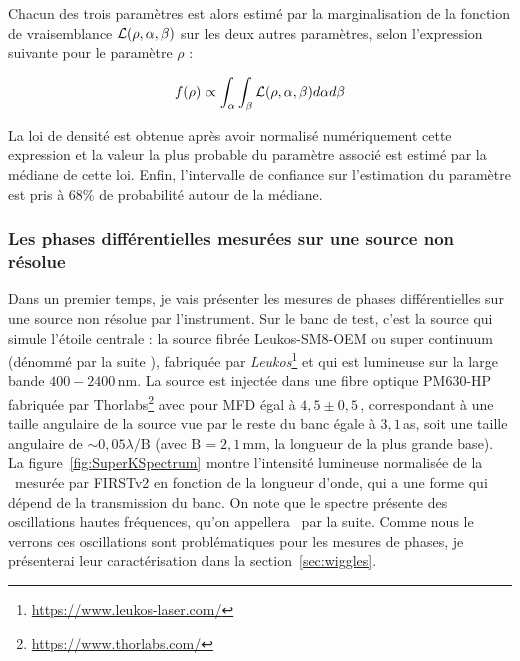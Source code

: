 Chacun des trois paramètres est alors estimé par la marginalisation de la fonction de vraisemblance $\mathcal{L} (\rho, \alpha, \beta)$ sur les deux autres paramètres, selon l'expression suivante pour le paramètre $\rho$ :

\begin{equation}
    f (\rho) \propto \int_{\alpha} \int_{\beta} \mathcal{L} (\rho, \alpha, \beta) d\alpha d\beta
\end{equation}

La loi de densité est obtenue après avoir normalisé numériquement cette expression et la valeur la plus probable du paramètre associé est estimé par la médiane de cette loi. Enfin, l'intervalle de confiance sur l'estimation du paramètre est pris à $68 \%$ de probabilité autour de la médiane.


\subsubsection{Les phases différentielles mesurées sur une source non résolue}

Dans un premier temps, je vais présenter les mesures de phases différentielles sur une source non résolue par l'instrument. Sur le banc de test, c'est la source qui simule l'étoile centrale : la source fibrée Leukos-SM8-OEM ou super continuum (dénommé par la suite \sk), fabriquée par \textit{Leukos}\footnote{\url{https://www.leukos-laser.com/}} et qui est lumineuse sur la large bande $400 - 2400 \,$nm. La source est injectée dans une fibre optique PM630-HP fabriquée par Thorlabs\footnote{\url{https://www.thorlabs.com/}} avec pour \ac{MFD} égal à $4,5 \pm 0,5 \,$\um, correspondant à une taille angulaire de la source vue par le reste du banc égale à $3,1 \,$as, soit une taille angulaire de $\sim 0,05 \lambda / \text{B}$ (avec $\text{B} = 2,1 \,$mm, la longueur de la plus grande base). La figure~\ref{fig:SuperKSpectrum} montre l'intensité lumineuse normalisée de la \sk~mesurée par \ac{FIRSTv2} en fonction de la longueur d'onde, qui a une forme qui dépend de la transmission du banc. On note que le spectre présente des oscillations hautes fréquences, qu'on appellera \wiggles~par la suite. Comme nous le verrons ces oscillations sont problématiques pour les mesures de phases, je présenterai leur caractérisation dans la section~\ref{sec:wiggles}.

